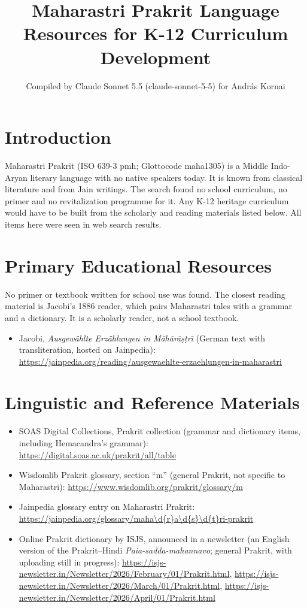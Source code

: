 \documentclass[12pt]{article}
\title{Maharastri Prakrit Language Resources for K-12 Curriculum Development}
\author{Compiled by Claude Sonnet 5.5 (claude-sonnet-5-5) for Andr\'as Kornai}
\date{}
\begin{document}
\maketitle

\section{Introduction}
Maharastri Prakrit (ISO 639-3 pmh; Glottocode maha1305) is a Middle Indo-Aryan literary language with no native speakers today. It is known from classical literature and from Jain writings. The search found no school curriculum, no primer and no revitalization programme for it. Any K-12 heritage curriculum would have to be built from the scholarly and reading materials listed below. All items here were seen in web search results.

\section{Primary Educational Resources}
No primer or textbook written for school use was found. The closest reading material is Jacobi's 1886 reader, which pairs Maharastri tales with a grammar and a dictionary. It is a scholarly reader, not a school textbook.
\begin{itemize}
\item Jacobi, \emph{Ausgew\"ahlte Erz\"ahlungen in M\=ah\=ar\=a\d{s}\d{t}r\=\i} (German text with transliteration, hosted on Jainpedia): \url{https://jainpedia.org/reading/ausgewaehlte-erzaehlungen-in-maharastri}
\end{itemize}

\section{Linguistic and Reference Materials}
\begin{itemize}
\item SOAS Digital Collections, Prakrit collection (grammar and dictionary items, including Hemacandra's grammar): \url{https://digital.soas.ac.uk/prakrit/all/table}
\item Wisdomlib Prakrit glossary, section ``m'' (general Prakrit, not specific to Maharastri): \url{https://www.wisdomlib.org/prakrit/glossary/m}
\item Jainpedia glossary entry on Maharastri Prakrit: \url{https://jainpedia.org/glossary/maha\d{r}a\d{s}\d{t}ri-prakrit}
\item Online Prakrit dictionary by ISJS, announced in a newsletter (an English version of the Prakrit--Hindi \emph{Paia-sadda-mahannavo}; general Prakrit, with uploading still in progress): \url{https://isjs-newsletter.in/Newsletter/2026/February/01/Prakrit.html}, \url{https://isjs-newsletter.in/Newsletter/2026/March/01/Prakrit.html}, \url{https://isjs-newsletter.in/Newsletter/2026/April/01/Prakrit.html}
\end{itemize}
\end{document}

